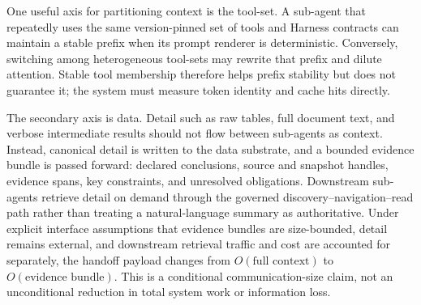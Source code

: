 \documentclass[11pt]{article}
\begin{document}
One useful axis for partitioning context is the tool-set. A sub-agent that repeatedly uses the same version-pinned set of tools and Harness contracts can maintain a stable prefix when its prompt renderer is deterministic. Conversely, switching among heterogeneous tool-sets may rewrite that prefix and dilute attention. Stable tool membership therefore helps prefix stability but does not guarantee it; the system must measure token identity and cache hits directly.

The secondary axis is data. Detail such as raw tables, full document text, and verbose intermediate results should not flow between sub-agents as context. Instead, canonical detail is written to the data substrate, and a bounded evidence bundle is passed forward: declared conclusions, source and snapshot handles, evidence spans, key constraints, and unresolved obligations. Downstream sub-agents retrieve detail on demand through the governed discovery--navigation--read path rather than treating a natural-language summary as authoritative. Under explicit interface assumptions that evidence bundles are size-bounded, detail remains external, and downstream retrieval traffic and cost are accounted for separately, the handoff payload changes from $O(\text{full context})$ to $O(\text{evidence bundle})$. This is a conditional communication-size claim, not an unconditional reduction in total system work or information loss.
\end{document}
